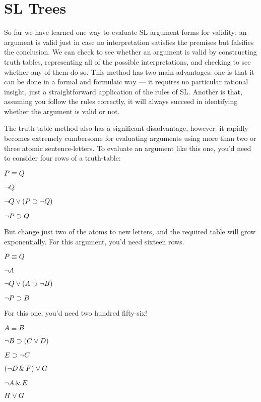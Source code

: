\chapter{SL Trees}
\label{ch.sl.trees}

So far we have learned one way to evaluate SL argument forms for validity: an argument is valid just in case no interpretation satisfies the premises but falsifies the conclusion. We can check to see whether an argument is valid by constructing truth tables, representing all of the possible interpretations, and checking to see whether any of them do so. This method has two main advantages: one is that it can be done in a formal and formulaic way  --- it requires no particular rational insight, just a straightforward application of the rules of SL. Another is that, assuming you follow the rules correctly, it will always succeed in identifying whether the argument is valid or not.

The truth-table method also has a significant disadvantage, however: it rapidly becomes extremely cumbersome for evaluating arguments using more than two or three atomic sentence-letters. To evaluate an argument like this one, you'd need to consider four rows of a truth-table:

\begin{earg}
\item[] $P\equiv Q$
\item[] $\neg Q$
\item[] $\neg Q \vee (P \supset \neg Q)$
\item[\therefore] $\neg P \supset Q$
\end{earg}

But change just two of the atoms to new letters, and the required table will grow exponentially. For this argument, you'd need sixteen rows.

\begin{earg}
\item[] $P\equiv Q$
\item[] $\neg A$
\item[] $\neg Q \vee (A \supset \neg B)$
\item[\therefore] $\neg P \supset B$
\end{earg}

For this one, you'd need two hundred fifty-six!
\label{8letterargument}
\begin{earg}
\item[] $A\equiv B$
\item[] $\neg B \supset (C \vee D)$
\item[] $E \supset \neg C$
\item[] $(\neg D \,\&\, F) \vee G$
\item[] $\neg A \,\&\, E$
\item[\therefore] $H \vee G$
\end{earg}

